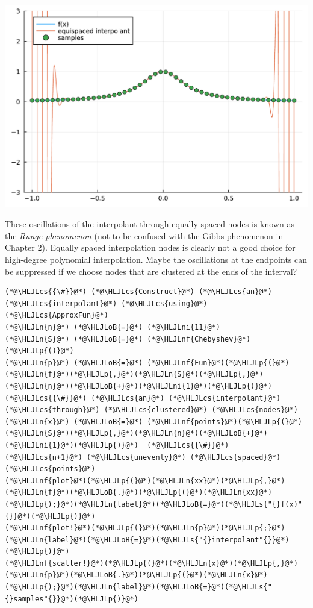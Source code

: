 \documentclass[12pt,a4paper]{article}
\newcommand{\HLJLn}[1]{#1}
\newcommand{\HLJLnf}[1]{\textcolor[RGB]{66,102,213}{#1}}
\newcommand{\HLJLs}[1]{\textcolor[RGB]{201,61,57}{#1}}
\newcommand{\HLJLni}[1]{\textcolor[RGB]{59,151,46}{#1}}
\newcommand{\HLJLoB}[1]{\textcolor[RGB]{102,102,102}{\textbf{#1}}}
\newcommand{\HLJLp}[1]{#1}
\newcommand{\HLJLcs}[1]{\textcolor[RGB]{153,153,119}{\textit{#1}}}
\begin{document}
\includegraphics[width=\linewidth]{jl_P71Faz/Chapter3_2_1.pdf}

These oscillations of the interpolant through equally spaced nodes is known as the \emph{Runge phenomenon} (not to be confused with the Gibbs phenomenon in Chapter 2). Equally spaced interpolation nodes is clearly not a good choice for high-degree polynomial interpolation.  Maybe the oscillations at the endpoints can be suppressed if we choose nodes that are clustered at the ends of the interval?


\begin{lstlisting}
(*@\HLJLcs{{\#}}@*) (*@\HLJLcs{Construct}@*) (*@\HLJLcs{an}@*) (*@\HLJLcs{interpolant}@*) (*@\HLJLcs{using}@*) (*@\HLJLcs{ApproxFun}@*)
(*@\HLJLn{n}@*) (*@\HLJLoB{=}@*) (*@\HLJLni{11}@*)
(*@\HLJLn{S}@*) (*@\HLJLoB{=}@*) (*@\HLJLnf{Chebyshev}@*)(*@\HLJLp{()}@*)
(*@\HLJLn{p}@*) (*@\HLJLoB{=}@*) (*@\HLJLnf{Fun}@*)(*@\HLJLp{(}@*)(*@\HLJLn{f}@*)(*@\HLJLp{,}@*)(*@\HLJLn{S}@*)(*@\HLJLp{,}@*)(*@\HLJLn{n}@*)(*@\HLJLoB{+}@*)(*@\HLJLni{1}@*)(*@\HLJLp{)}@*) (*@\HLJLcs{{\#}}@*) (*@\HLJLcs{an}@*) (*@\HLJLcs{interpolant}@*) (*@\HLJLcs{through}@*) (*@\HLJLcs{clustered}@*) (*@\HLJLcs{nodes}@*)
(*@\HLJLn{x}@*) (*@\HLJLoB{=}@*) (*@\HLJLnf{points}@*)(*@\HLJLp{(}@*)(*@\HLJLn{S}@*)(*@\HLJLp{,}@*)(*@\HLJLn{n}@*)(*@\HLJLoB{+}@*)(*@\HLJLni{1}@*)(*@\HLJLp{)}@*)  (*@\HLJLcs{{\#}}@*) (*@\HLJLcs{n+1}@*) (*@\HLJLcs{unevenly}@*) (*@\HLJLcs{spaced}@*) (*@\HLJLcs{points}@*) 
(*@\HLJLnf{plot}@*)(*@\HLJLp{(}@*)(*@\HLJLn{xx}@*)(*@\HLJLp{,}@*)(*@\HLJLn{f}@*)(*@\HLJLoB{.}@*)(*@\HLJLp{(}@*)(*@\HLJLn{xx}@*)(*@\HLJLp{);}@*)(*@\HLJLn{label}@*)(*@\HLJLoB{=}@*)(*@\HLJLs{"{}f(x)"{}}@*)(*@\HLJLp{)}@*)
(*@\HLJLnf{plot!}@*)(*@\HLJLp{(}@*)(*@\HLJLn{p}@*)(*@\HLJLp{;}@*)(*@\HLJLn{label}@*)(*@\HLJLoB{=}@*)(*@\HLJLs{"{}interpolant"{}}@*)(*@\HLJLp{)}@*)
(*@\HLJLnf{scatter!}@*)(*@\HLJLp{(}@*)(*@\HLJLn{x}@*)(*@\HLJLp{,}@*)(*@\HLJLn{p}@*)(*@\HLJLoB{.}@*)(*@\HLJLp{(}@*)(*@\HLJLn{x}@*)(*@\HLJLp{);}@*)(*@\HLJLn{label}@*)(*@\HLJLoB{=}@*)(*@\HLJLs{"{}samples"{}}@*)(*@\HLJLp{)}@*)
\end{lstlisting}
\end{document}
